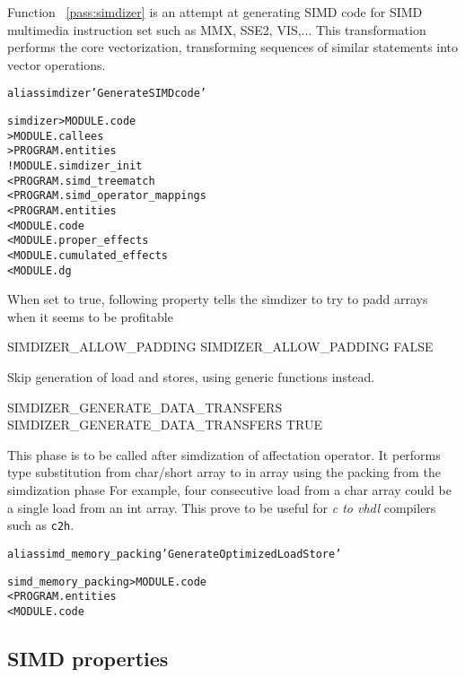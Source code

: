 \documentclass[a4paper]{report}
\newenvironment{PipsMake}{\begin{alltt}}{\end{alltt}}
\newcommand{\PipsPassRef}[1]{\texttt{\detokenize{#1}}~\ref{pass:#1}}
\newenvironment{PipsPass}[1]{\label{pass:#1}}{}
\begin{document}
\begin{PipsPass}{simdizer}
Function \PipsPassRef{simdizer} is an attempt at generating SIMD code for SIMD
multimedia instruction set such as MMX, SSE2, VIS,... This
transformation performs the core vectorization, transforming sequences
of similar statements into vector operations.
\end{PipsPass}

\begin{PipsMake}
alias simdizer 'Generate SIMD code'

simdizer                    > MODULE.code
                            > MODULE.callees
                            > PROGRAM.entities
		! MODULE.simdizer_init
		< PROGRAM.simd_treematch
		< PROGRAM.simd_operator_mappings
        < PROGRAM.entities
        < MODULE.code
        < MODULE.proper_effects
        < MODULE.cumulated_effects
        < MODULE.dg
\end{PipsMake}

When set to true, following property tells the simdizer to try to padd arrays when it seems to be profitable
\begin{PipsProp}{SIMDIZER_ALLOW_PADDING}
SIMDIZER_ALLOW_PADDING FALSE
\end{PipsProp}

Skip generation of load and stores, using generic functions instead.
\begin{PipsProp}{SIMDIZER_GENERATE_DATA_TRANSFERS}
SIMDIZER_GENERATE_DATA_TRANSFERS TRUE
\end{PipsProp}

\begin{PipsPass}{simd_memory_packing}
This phase is to be called after simdization of affectation operator.
It performs type substitution from char/short array to in array
using the packing from the simdization phase
For example, four consecutive load from a char array could be a single load from an int array.
This prove to be useful for \textit{c to vhdl} compilers such as \texttt{c2h}.
\end{PipsPass}

\begin{PipsMake}
alias simd_memory_packing 'Generate Optimized Load Store'

simd_memory_packing  > MODULE.code
        < PROGRAM.entities
        < MODULE.code
\end{PipsMake}

\subsection{SIMD properties}
\end{document}
